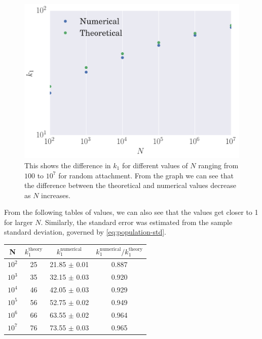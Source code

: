 \begin{figure}
    \centering
    \includegraphics[height=0.5\linewidth]{img/ra-numerical-theoretical-k1}
    \caption{This shows the difference in $k_1$ for different values of $N$ ranging from $100$ to $10^7$ for random attachment. From the graph we can see that the difference between the theoretical and numerical values decrease as $N$ increases.}
    \label{fig:ra-numerical-theoretical-k1}
\end{figure}

From the following tables of values, we can also see that the values get closer to 1 for larger $N$. Similarly, the standard error was estimated from the sample standard deviation, governed by \autoref{eq:population-std}. 

\begin{center}
\begin{tabular}{ ||c | c | c | c ||}
\hline
N & $k_1^{\text{theory}}$ & $k_1^{\text{numerical}}$ & $k_1^{\text{numerical}} / k_1^{\text{theory}} $\\ 
\hline
$10^2$ & 25    & 21.85  $\pm$ 0.01 & 0.887 \\  
$10^3$ & 35   & 32.15 $\pm$ 0.03 & 0.920 \\
$10^4$ & 46   & 42.05   $\pm$  0.03  & 0.929 \\
$10^5$ & 56  & 52.75  $\pm$  0.02  & 0.949 \\
$10^6$ & 66  & 63.55  $\pm$  0.02  & 0.964 \\
$10^7$ & 76 & 73.55 $\pm$ 0.03  & 0.965 \\  
\hline
\end{tabular}
\label{table:ra-numerical-theoretical-ratio}
\end{center}